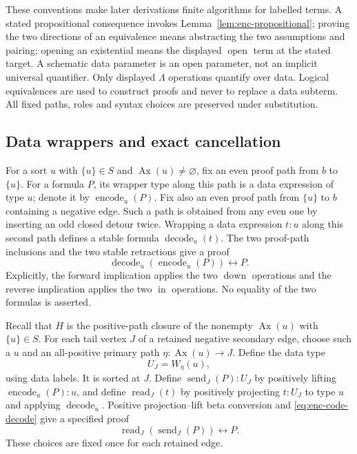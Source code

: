 These conventions make later derivations finite algorithms for labelled
terms.  A stated propositional consequence invokes
Lemma~\ref{lem:enc-propositional}; proving the two directions of an
 equivalence means abstracting the two assumptions and pairing; opening an
existential means the displayed $\operatorname{open}$ term at the stated
target.  A schematic data parameter is an open parameter, not an implicit
universal quantifier.  Only displayed $\Lambda$ operations quantify over
data.  Logical equivalences are used to construct proofs and never to
replace a data subterm.  All fixed paths, roles and syntax choices are
preserved under substitution.

\subsection{Data wrappers and exact cancellation}
\label{subsec:enc-data-transport}

For a sort $u$ with $\{u\}\in S$ and
$\operatorname{Ax}(u)\ne\varnothing$, fix an even proof path from $b$
to $\{u\}$.  For a formula $P$, its wrapper type along this path is a
data expression of type $u$; denote it by $\operatorname{encode}_u(P)$.
Fix also an even proof path from $\{u\}$ to $b$ containing a negative
edge.  Such a path is obtained from any even one by inserting an odd
closed detour twice.  Wrapping a data expression $t:u$ along this second
path defines a stable formula $\operatorname{decode}_u(t)$.
The two proof-path inclusions and the two stable retractions give a proof
\begin{equation}
 \operatorname{decode}_u(\operatorname{encode}_u(P))
                             \leftrightarrow P.
 \label{eq:enc-code-decode}
\end{equation}
Explicitly, the forward implication applies the two $\operatorname{down}$
operations and the reverse implication applies the two
$\operatorname{in}$ operations.  No equality of the two formulas is asserted.

Recall that $H$ is the positive-path closure of the nonempty
$\operatorname{Ax}(u)$ with $\{u\}\in S$.  For each tail vertex $J$
of a retained negative secondary edge, choose such a $u$ and an all-positive
primary path $\eta:\operatorname{Ax}(u)\to J$.  Define the data type
\[
                 U_J=W_\eta(u),
\]
using data labels.  It is sorted at $J$.  Define
$\operatorname{send}_J(P):U_J$ by positively lifting
$\operatorname{encode}_u(P):u$, and define
$\operatorname{read}_J(t)$ by positively projecting $t:U_J$ to type
$u$ and applying $\operatorname{decode}_u$.  Positive
projection--lift beta conversion and \eqref{eq:enc-code-decode} give a
specified proof
\begin{equation}
        \operatorname{read}_J(\operatorname{send}_J(P))
                                     \leftrightarrow P.
        \label{eq:enc-read-send}
\end{equation}
These choices are fixed once for each retained edge.


